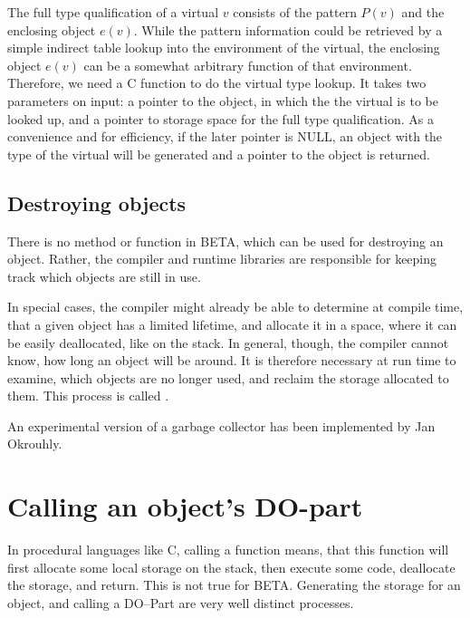 The full type qualification of a virtual $v$ consists of the
pattern $P(v)$ and the enclosing object $e(v)$.  While the
pattern information could be retrieved by a simple indirect table
lookup into the environment of the virtual, the enclosing object
$e(v)$ can be a somewhat arbitrary function of that environment.
Therefore, we need a C function to do the virtual type lookup.
It takes two parameters on input: a pointer to the object, in
which the the virtual is to be looked up, and a pointer to
storage space for the full type qualification.  As a convenience
and for efficiency, if the later pointer is NULL, an object with
the type of the virtual will be generated and a pointer to the
object is returned.

\subsection{Destroying objects}
There is no method or function in BETA, which can be used for
destroying an object.  Rather, the compiler and runtime libraries
are responsible for keeping track which objects are still in use.

In special cases, the compiler might already be able to determine
at compile time, that a given object has a limited lifetime, and
allocate it in a space, where it can be easily deallocated, like
on the stack.  In general, though, the compiler cannot know, how
long an object will be around.  It is therefore necessary at run
time to examine, which objects are no longer used, and reclaim
the storage allocated to them.  This process is called
.

An experimental version of a garbage collector has been
implemented by Jan Okrouhly.

\section{Calling an object's DO-part}
\label{call-do-part}
In procedural languages like C, calling a function means, that
this function will first allocate some local storage on the stack,
then execute some code, deallocate the storage, and return.  This
is not true for BETA.  Generating the storage for an object, and
calling a DO--Part are very well distinct processes.

